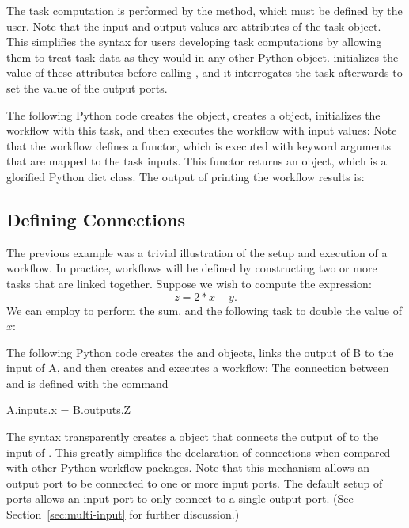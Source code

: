 The task computation is performed by the  method, which
must be defined by the user.  Note that the input and output values are
attributes of the task object.  This simplifies the syntax for users
developing task computations by allowing them to treat task data as they
would in any other Python object.  \pwsp initializes the value of these
attributes before calling , and it interrogates the task
afterwards to set the value of the output ports.

The following Python code creates the  object, creates a 
object, initializes the workflow with this task, and then executes the workflow
with input values:
Note that the workflow defines a functor, which is executed with keyword arguments that are mapped to the task inputs.  This functor returns an  object, which is a glorified Python dict class.  The output of printing the workflow results is:



\subsection{Defining Connections}

The previous example was a trivial illustration of the setup and execution of a workflow.  In practice, workflows will be defined by constructing two or more tasks that are linked together.  Suppose we wish to compute the expression:
\[
z = 2*x+y.
\]
We can employ  to perform the sum, and the following task to double the value of $x$:

The following Python code creates the  and  objects, links the output of B to the input of A, and then creates and executes a workflow:
The connection between  and  is defined with the command
\begin{qlisting}
A.inputs.x = B.outputs.Z
\end{qlisting}
The syntax transparently creates a  object that connects the  output of  to the  input of .  This greatly simplifies
the declaration of connections when compared with other Python workflow packages.  Note that this mechanism allows an output port to be connected to one or more
input ports.  The default setup of ports allows an input port to only connect to a single output port.  (See Section~\ref{sec:multi-input} for further discussion.)

